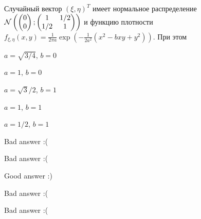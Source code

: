 
\begin{question}
Случайный вектор \((\xi, \eta)^T\) имеет нормальное распределение
\(\mathcal{N} \left( \begin{pmatrix} 0 \\ 0 \end{pmatrix}; \begin{pmatrix} 1 & 1/2 \\ 1/2 & 1 \end{pmatrix} \right)\)
и функцию плотности
\(f_{\xi, \eta}(x, y) = \frac{1}{2\pi a} \exp\left(-\frac{1}{2a^2}(x^2-bxy+y^2) \right)\).
При этом
\begin{answerlist}
  \item \(a=\sqrt{3/4}\), \(b=0\)
  \item \(a=1\), \(b=0\)
  \item \(a=\sqrt{3}/2\), \(b=1\)
  \item \(a=1\), \(b=1\)
  \item \(a=1/2\), \(b=1\)
\end{answerlist}
\end{question}

\begin{solution}
\begin{answerlist}
  \item Bad answer :(
  \item Bad answer :(
  \item Good answer :)
  \item Bad answer :(
  \item Bad answer :(
\end{answerlist}
\end{solution}

